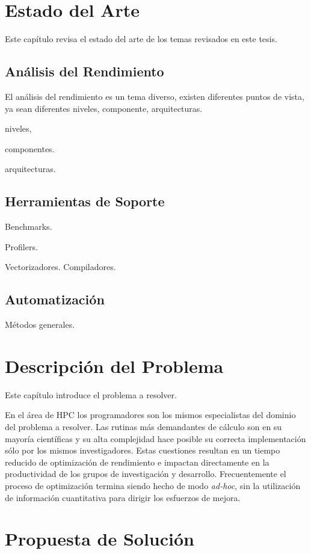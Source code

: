 \documentclass[a4paper]{report}
\begin{document}
\chapter{Estado del Arte}

Este capítulo revisa el estado del arte de los temas revisados en este tesis.

\section{Análisis del Rendimiento}

El análisis del rendimiento es un tema diverso, existen diferentes puntos de vista, ya sean diferentes niveles, componente, arquitecturas.

niveles,

componentes.

arquitecturas.

\section{Herramientas de Soporte}

Benchmarks.

Profilers.

Vectorizadores. Compiladores.

\section{Automatización}

Métodos generales.

\chapter{Descripción del Problema}

Este capítulo introduce el problema a resolver.

En el área de HPC los programadores son los mismos especialistas del dominio del problema a resolver. Las rutinas
más demandantes de cálculo son en su mayoría científicas y su alta complejidad hace posible su correcta implementación sólo por los mismos investigadores. Estas cuestiones resultan en un tiempo reducido de optimización de rendimiento
e impactan directamente en la productividad de los grupos de investigación y desarrollo. Frecuentemente el proceso de optimización termina siendo hecho de modo {\it ad-hoc}, sin la utilización de información cuantitativa para dirigir los
esfuerzos de mejora.

\chapter{Propuesta de Solución}
\end{document}
